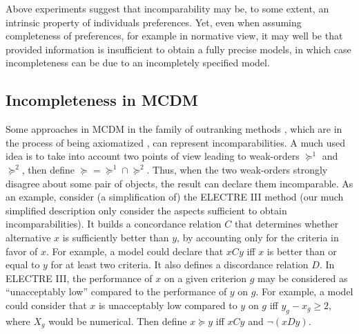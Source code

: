 \documentclass[french, english]{llncs}
\begin{document}
	
	Above experiments suggest that incomparability may be, to some extent, an intrinsic property of individuals preferences. Yet, even when assuming completeness of preferences, for example in normative view, it may well be that provided information is insufficient to obtain a fully precise models, in which case incompleteness can be due to an incompletely specified model. 
	
	\subsection{Incompleteness in MCDM}
	Some approaches in MCDM in the family of outranking methods \citep{roy_multicriteria_1996, greco_multiple_2016, bouyssou_evaluation_2000, bouyssou_evaluation_2006}, which are in the process of being axiomatized \citep{bouyssou_consolidated_2015}, can represent incomparabilities. A much used idea is to take into account two points of view leading to weak-orders $\succeq^1$ and $\succeq^2$, then define ${\succeq} = {\succeq^1} ∩ {\succeq^2}$. Thus, when the two weak-orders strongly disagree about some pair of objects, the result can declare them incomparable. As an example, consider (a simplification of) the ELECTRE III method (our much simplified description only consider the aspects sufficient to obtain incomparabilities). It builds a concordance relation $C$ that determines whether alternative $x$ is sufficiently better than $y$, by accounting only for the criteria in favor of $x$. For example, a model could declare that $x C y$ iff $x$ is better than or equal to $y$ for at least two criteria. It also defines a discordance relation $D$. In ELECTRE III, the performance of $x$ on a given criterion $g$ may be considered as “unacceptably low” compared to the performance of $y$ on $g$. For example, a model could consider that $x$ is unacceptably low compared to $y$ on $g$ iff $y_g - x_g ≥ 2$, where $X_g$ would be numerical. Then define $x \succeq y$ iff $x C y$ and $¬(x D y)$.
	
\end{document}
